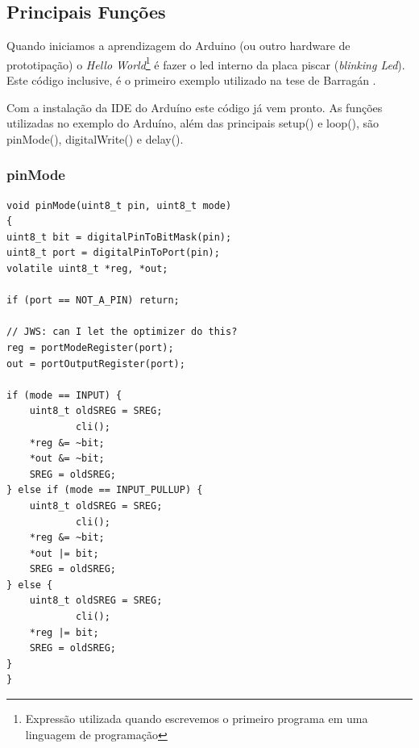 \subsection{Principais Funções}

Quando iniciamos a aprendizagem do Arduino (ou outro hardware de prototipação) o \emph{Hello World}\footnote{Expressão utilizada quando escrevemos o primeiro programa em uma linguagem de programação} é fazer o led interno da placa piscar (\emph{blinking Led}). Este código inclusive, é o primeiro exemplo utilizado na tese de Barragán \cite[p.~39]{Barragan2004}. 

Com a instalação da IDE do Arduíno este código já vem pronto. As funções utilizadas no exemplo do Arduíno, além das principais setup() e loop(), são pinMode(), digitalWrite() e delay().\newline

\subsubsection{pinMode}

 
\begin{lstlisting}
void pinMode(uint8_t pin, uint8_t mode)
{
uint8_t bit = digitalPinToBitMask(pin);
uint8_t port = digitalPinToPort(pin);
volatile uint8_t *reg, *out;

if (port == NOT_A_PIN) return;

// JWS: can I let the optimizer do this?
reg = portModeRegister(port);
out = portOutputRegister(port);

if (mode == INPUT) { 
	uint8_t oldSREG = SREG;
            cli();
	*reg &= ~bit;
	*out &= ~bit;
	SREG = oldSREG;
} else if (mode == INPUT_PULLUP) {
	uint8_t oldSREG = SREG;
            cli();
	*reg &= ~bit;
	*out |= bit;
	SREG = oldSREG;
} else {
	uint8_t oldSREG = SREG;
            cli();
	*reg |= bit;
	SREG = oldSREG;
}
}
\end{lstlisting}

